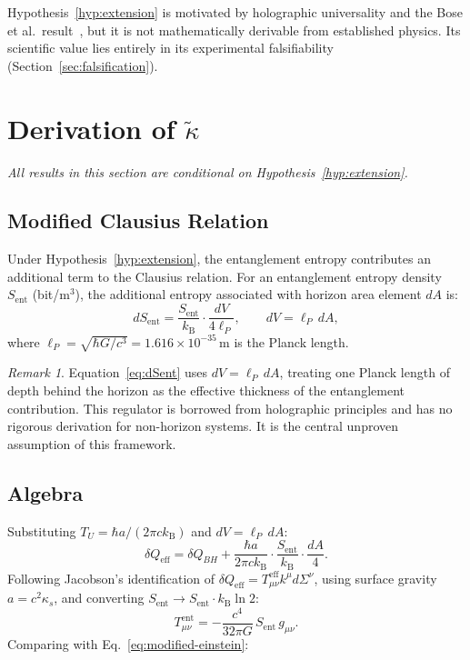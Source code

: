\documentclass[12pt,letterpaper]{article}
\theoremstyle{plain}
\theoremstyle{definition}
\theoremstyle{remark}
\newtheorem{remark}[theorem]{Remark}
\newcommand{\kB}{k_{\mathrm{B}}}
\newcommand{\lnTwo}{\ln 2}
\newcommand{\lP}{\ell_{P}}
\newcommand{\kt}{\tilde{\kappa}}
\newcommand{\Sent}{S_{\mathrm{ent}}}
\begin{document}
Hypothesis~\ref{hyp:extension} is motivated by holographic universality and the Bose et al.\
result~\cite{Bose2017}, but it is not mathematically derivable from established physics.  Its
scientific value lies entirely in its experimental falsifiability (Section~\ref{sec:falsification}).

\section{Derivation of $\kt$}
\label{sec:kappa}

\emph{All results in this section are conditional on Hypothesis~\ref{hyp:extension}.}

\subsection{Modified Clausius Relation}

Under Hypothesis~\ref{hyp:extension}, the entanglement entropy contributes an additional term
to the Clausius relation.  For an entanglement entropy density $\Sent$ (bit/m$^{3}$), the
additional entropy associated with horizon area element $dA$ is:
\begin{equation}
  dS_{\mathrm{ent}}
  = \frac{\Sent}{\kB}\cdot\frac{dV}{4\lP},
  \qquad
  dV = \lP\,dA,
  \label{eq:dSent}
\end{equation}
where $\lP = \sqrt{\hbar G/c^{3}} = 1.616\times10^{-35}$\,m is the Planck length.

\begin{remark}
Equation~\eqref{eq:dSent} uses $dV = \lP\,dA$, treating one Planck length of depth behind
the horizon as the effective thickness of the entanglement contribution.  This regulator is
borrowed from holographic principles and has no rigorous derivation for non-horizon systems.
It is the central unproven assumption of this framework.
\end{remark}

\subsection{Algebra}

Substituting $T_{U} = \hbar a/(2\pi c\kB)$ and $dV = \lP\,dA$:
\begin{equation}
  \delta Q_{\mathrm{eff}}
  = \delta Q_{BH}
    + \frac{\hbar a}{2\pi c\kB}\cdot\frac{\Sent}{\kB}\cdot\frac{dA}{4}.
  \label{eq:dQeff}
\end{equation}
Following Jacobson's identification of $\delta Q_{\mathrm{eff}} = T^{\mathrm{eff}}_{\mu\nu}
k^{\mu}d\Sigma^{\nu}$, using surface gravity $a = c^{2}\kappa_{s}$, and converting
$\Sent \to \Sent\cdot\kB\lnTwo$:
\begin{equation}
  T^{\mathrm{ent}}_{\mu\nu}
  = -\frac{c^{4}}{32\pi G}\,\Sent\,g_{\mu\nu}.
  \label{eq:Tent}
\end{equation}
Comparing with Eq.~\eqref{eq:modified-einstein}:
\end{document}
